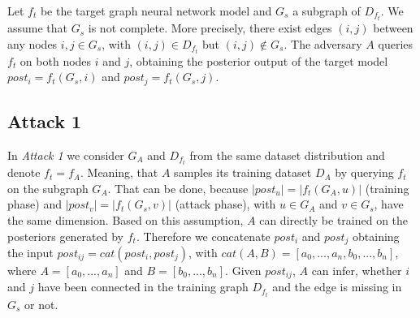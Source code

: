     Let $f_t$ be the target graph neural network model and $G_s$ a subgraph of $D_{f_t}$.
    We assume that $G_s$ is not complete. 
    More precisely, there exist edges $(i,j)$ between any nodes $i,j \in G_s$, with $(i,j) \in D_{f_t}$ but $(i,j) \not\in G_s$.
    The adversary $A$ queries $f_t$ on both nodes $i$ and $j$, obtaining the posterior output of the target model $post_i = f_t(G_s, i)$ and $post_j = f_t(G_s, j)$.

    \subsection*{Attack 1}
    \label{section:attack1}
      In \emph{Attack 1} we consider $G_A$ and $D_{f_t}$ from the same dataset distribution and denote $f_t = f_A$.
      Meaning, that $A$ samples its training dataset $D_A$ by querying $f_t$ on the subgraph $G_A$.
      That can be done, because $|post_u| = |f_t(G_A,u)|$ (training phase) and $|post_v| = |f_t(G_s,v)|$ (attack phase), with $u \in G_A$ and $v \in G_s$, have the same dimension.
      Based on this assumption, $A$ can directly be trained on the posteriors generated by $f_t$.
      Therefore we concatenate $post_i$ and $post_j$ obtaining the input $post_{ij} = cat(post_i, post_j)$, with $cat(A,B) = [a_0,...,a_n,b_0,...,b_n]$, where $A = [a_0,...,a_n]$ and $B = [b_0,...,b_n]$. 
      Given $post_{ij}$, $A$ can infer, whether $i$ and $j$ have been connected in the training graph $D_{f_t}$ and the edge is missing in $G_s$ or not.

